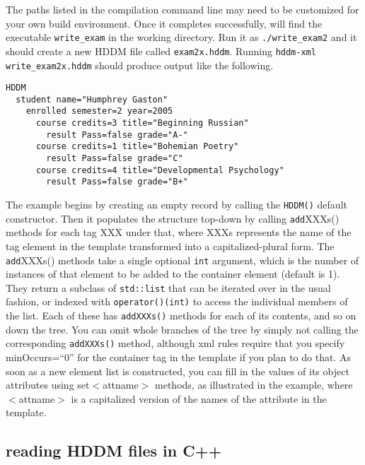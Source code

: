 \documentclass{revtex4}
\begin{document}
The paths listed in the compilation command line may need to be customized
for your own build environment. Once it completes successfully, will find
the executable \texttt{write\_exam} in the working directory. Run it as
\texttt{./write\_exam2} and it should create a new HDDM file called 
\texttt{exam2x.hddm}. Running \texttt{hddm-{}xml write\_exam2x.hddm}
should produce output like the following.

\vspace{0.5cm}
\begin{minipage}{12cm}
\begin{verbatim}
HDDM
  student name="Humphrey Gaston"
    enrolled semester=2 year=2005
      course credits=3 title="Beginning Russian"
        result Pass=false grade="A-"
      course credits=1 title="Bohemian Poetry"
        result Pass=false grade="C"
      course credits=4 title="Developmental Psychology"
        result Pass=false grade="B+"
\end{verbatim}
\end{minipage}
\vspace{0.5cm}

The example begins by creating an empty record by calling the 
\texttt{HDDM()} default constructor. Then it populates the structure
top-{}down by calling \texttt{add}XXXs() methods for each tag XXX
under that, where XXXs represents the name of the tag element in the
template transformed into a capitalized-{}plural form. The 
\texttt{add}XXXs() methods take a single optional \texttt{int} argument,
which is the number of instances of
that element to be added to the container element (default is 1). They
return a subclass of \texttt{std::list} that can be iterated over in the
usual fashion, or indexed with \texttt{operator()(int)} to access the
individual members of the list. Each of these has \texttt{addXXXs()}
methods for each of its contents, and so on down the tree. You can omit
whole branches of the tree by simply not calling the corresponding
\texttt{addXXXs()} method, although xml rules require that you specify
minOccurs=``0'' for the container tag in the template if you plan to do
that. As soon as a new element list is constructed, you can fill in the
values of its object attributes using set{\mbox{$<$}}attname{\mbox{$>$}}
methods, as illustrated in the example, where {\mbox{$<$}}attname{\mbox{$>$}}
is a capitalized version of the names of the attribute in the template.

\subsection{reading HDDM files in C++}
\end{document}
